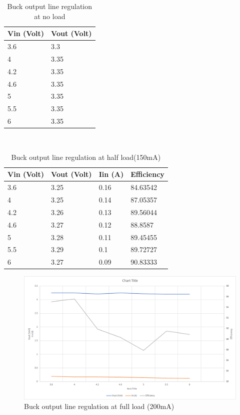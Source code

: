 \begin{table}[H]
\centering
\begin{tabular}{|l|l|}
\hline
Vin (Volt) & Vout (Volt) \\ \hline
3.6        & 3.3         \\ \hline
4          & 3.35        \\ \hline
4.2        & 3.35        \\ \hline
4.6        & 3.35        \\ \hline
5          & 3.35        \\ \hline
5.5        & 3.35        \\ \hline
6          & 3.35        \\ \hline
\end{tabular}
\caption{Buck output line regulation at no load}
\label{table:4}
\end{table}
\\
\begin{table}[H]
\centering
\begin{tabular}{|l|l|l|l|}
\hline
Vin (Volt) & Vout (Volt) & Iin (A) & Efficiency \\ \hline
3.6        & 3.25        & 0.16    & 84.63542   \\ \hline
4          & 3.25        & 0.14    & 87.05357   \\ \hline
4.2        & 3.26        & 0.13    & 89.56044   \\ \hline
4.6        & 3.27        & 0.12    & 88.8587    \\ \hline
5          & 3.28        & 0.11    & 89.45455   \\ \hline
5.5        & 3.29        & 0.1     & 89.72727   \\ \hline
6          & 3.27        & 0.09    & 90.83333   \\ \hline
\end{tabular}
\caption{Buck output line regulation at half load(150mA)}
\label{table:4}
\end{table}
\begin{figure}[H]
	\centering
	\includegraphics[width=\columnwidth]{IMGS/Buck output line regulation at full load (200mA).png}
	\caption{Buck output line regulation at full load (200mA)}
	\label{fig:arch}
\end{figure}
\\

